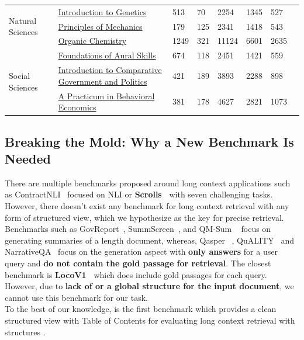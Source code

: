 \begin{table}[h!]
{\begin{tabular}{llllllll}
\midrule
\multirow{3}{*}{Natural Sciences} & \href{https://open.umn.edu/opentextbooks/textbooks/1279}{Introduction to Genetics} & 513 & 70 & 2254&1345&527 \\
& \href{https://open.umn.edu/opentextbooks/textbooks/1600}{Principles of Mechanics} & 179 & 125 & 2341&1418&543 \\
& \href{https://open.umn.edu/opentextbooks/textbooks/organic-chemistry}{Organic Chemistry} & 1249 & 321 & 11124&6601&2635 \\
\midrule
\multirow{3}{*}{Social Sciences} & \href{https://open.umn.edu/opentextbooks/textbooks/1446}{Foundations of Aural Skills} & 674 & 118 & 2451&1421&559 \\
& \href{https://open.umn.edu/opentextbooks/textbooks/1435}{Introduction to Comparative Government and Politics} & 421 & 189 & 3893&2288&898 \\
& \href{https://open.umn.edu/opentextbooks/textbooks/a-practicum-in-behavioral-economics}{A Practicum in Behavioral Economics} & 381 & 178 & 4627&2821&1073 \\
\end{tabular}
}
\end{table}

\subsection{Breaking the Mold: Why a New Benchmark Is Needed}
There are multiple benchmarks proposed around long context applications such as ContractNLI~\citep{koreeda-manning-2021-contractnli-dataset} focused on NLI or \textbf{Scrolls~\citep{shaham-etal-2022-scrolls}} with seven challenging tasks. However, there doesn't exist any benchmark for long context retrieval with any form of structured view, which we hypothesize as the key for precise retrieval. Benchmarks such as GovReport~\citep{huang2021govreport}, SummScreen~\citep{chen-etal-2022-summscreen}, and QM-Sum ~\cite{zhong2021qmsum} focus on generating summaries of a length document, whereas, Qasper ~\citep{dasigi2021qasper}, QuALITY~\citep{pang-etal-2022-quality} and NarrativeQA~\citep{kocisky2018narrativeqa} focus on the generation aspect with \textbf{only answers} for a user query and \textbf{do not contain the gold passage for retrieval}. The closest benchmark is \textbf{LocoV1~\citep{SaadFalcon2024BenchmarkingAB}} which does include gold passages for each query. However, due to \textbf{lack of {\toc} or a global structure for the input document}, we cannot use this benchmark for our task.\\ To the best of our knowledge, {\ben} is the first benchmark which provides a clean structured view with Table of Contents for evaluating long context retrieval with structures . 

